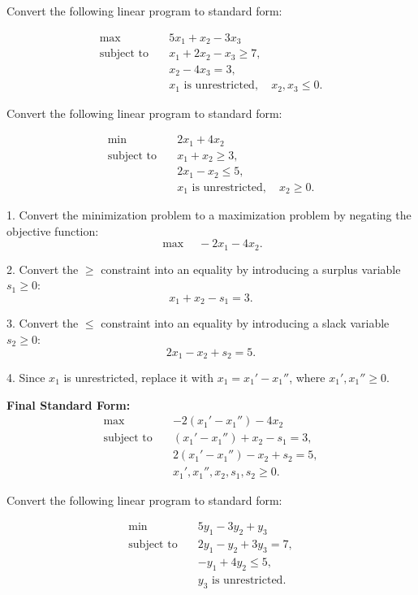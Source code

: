 \begin{ex}{}{}
Convert the following linear program to standard form:

\[
\begin{aligned}
    \max \quad & 5x_1 + x_2 - 3x_3 \\
    \text{subject to} \quad 
    & x_1 + 2x_2 - x_3 \geq 7, \\
    & x_2 - 4x_3 = 3, \\
    & x_1 \text{ is unrestricted}, \quad x_2, x_3 \leq 0.
\end{aligned}
\]
\end{ex}


\begin{ex}{}{}
 Convert the following linear program to standard form:

\[
\begin{aligned}
    \min \quad & 2x_1 + 4x_2 \\
    \text{subject to} \quad 
    & x_1 + x_2 \geq 3, \\
    & 2x_1 - x_2 \leq 5, \\
    & x_1 \text{ is unrestricted}, \quad x_2 \geq 0.
\end{aligned}
\]
\end{ex}
\begin{solution}

1. Convert the minimization problem to a maximization problem by negating the objective function:
   \[
   \max \quad -2x_1 - 4x_2.
   \]
   
2. Convert the \( \geq \) constraint into an equality by introducing a surplus variable \( s_1 \geq 0 \):
   \[
   x_1 + x_2 - s_1 = 3.
   \]
   
3. Convert the \( \leq \) constraint into an equality by introducing a slack variable \( s_2 \geq 0 \):
   \[
   2x_1 - x_2 + s_2 = 5.
   \]
   
4. Since \( x_1 \) is unrestricted, replace it with \( x_1 = x_1' - x_1'' \), where \( x_1', x_1'' \geq 0 \).

\textbf{Final Standard Form:}
\[
\begin{aligned}
    \max \quad & -2(x_1' - x_1'') - 4x_2 \\
    \text{subject to} \quad 
    & (x_1' - x_1'') + x_2 - s_1 = 3, \\
    & 2(x_1' - x_1'') - x_2 + s_2 = 5, \\
    & x_1', x_1'', x_2, s_1, s_2 \geq 0.
\end{aligned}
\]
\end{solution}
\vspace{1cm}
\begin{ex}{}{}
Convert the following linear program to standard form:

\[
\begin{aligned}
    \min \quad & 5y_1 - 3y_2 + y_3 \\
    \text{subject to} \quad 
    & 2y_1 - y_2 + 3y_3 = 7, \\
    & -y_1 + 4y_2 \leq 5, \\
    & y_3 \text{ is unrestricted}.
\end{aligned}
\]
\end{ex}



